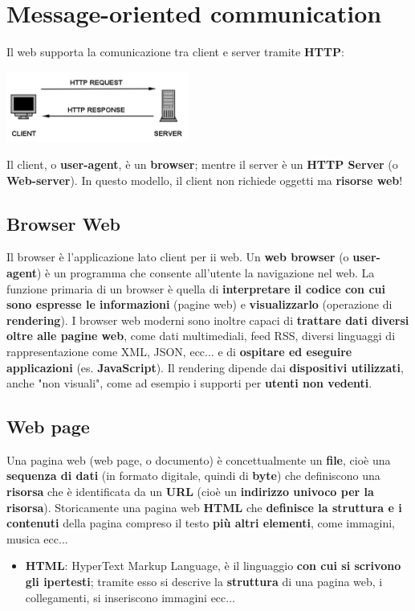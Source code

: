 \documentclass[12pt]{article}
\begin{document}
\section{Message-oriented communication}
Il web supporta la comunicazione tra client e server tramite \textbf{HTTP}:
\begin{center}
    \includegraphics[width = 0.45\textwidth]{Images/112.png}
\end{center}
Il client, o \textbf{user-agent}, è un \textbf{browser}; mentre il server è un \textbf{HTTP Server} (o \textbf{Web-server}). In questo modello, il client non richiede oggetti ma \textbf{risorse web}!
\subsection{Browser Web}
Il browser è l'applicazione lato client per ii web. Un \textbf{web browser} (o \textbf{user-agent}) è un programma che consente all'utente la navigazione nel web. La funzione primaria di un browser è quella di \textbf{interpretare il codice con cui sono espresse le informazioni} (pagine web) e \textbf{visualizzarlo} (operazione di \textbf{rendering}). I browser web moderni sono inoltre capaci di \textbf{trattare dati diversi oltre alle pagine web}, come dati multimediali, feed RSS, diversi linguaggi di rappresentazione come XML, JSON, ecc... e di \textbf{ospitare ed eseguire applicazioni} (es. \textbf{JavaScript}). Il rendering dipende dai \textbf{dispositivi utilizzati}, anche "non visuali", come ad esempio i supporti per \textbf{utenti non vedenti}.
\subsection{Web page}
Una pagina web (web page, o documento) è concettualmente un \textbf{file}, cioè una \textbf{sequenza di dati} (in formato digitale, quindi di \textbf{byte}) che definiscono una \textbf{risorsa} che è identificata da un \textbf{URL} (cioè un \textbf{indirizzo univoco per la risorsa}). Storicamente una pagina web \textbf{HTML} che \textbf{definisce la struttura e i contenuti} della pagina compreso il testo \textbf{più altri elementi}, come immagini, musica ecc... \newline
\begin{itemize}
    \item \textbf{HTML}: HyperText Markup Language, è il linguaggio \textbf{con cui si scrivono gli ipertesti}; tramite esso si descrive la \textbf{struttura} di una pagina web, i collegamenti, si inseriscono immagini ecc...
\end{itemize}
\end{document}
